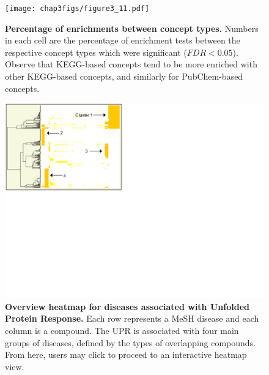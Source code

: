 \newpage

\begin{figure}[ht!]
\centering
\texttt{[image: chap3figs/figure3\_11.pdf]}
\caption[Proportion of enrichments between concept types.]
{
\textbf{Percentage of enrichments between concept types.} Numbers in each cell are the percentage of enrichment tests between the respective concept types which were significant ($FDR < 0.05$). Observe that KEGG-based concepts tend to be more enriched with other KEGG-based concepts, and similarly for PubChem-based concepts.
}
\label{chap3:fig:11}
\end{figure}

\newpage

\begin{figure}[ht!]
\centering
\includegraphics[width=1\textwidth]{chap3figs/figure3_12.pdf}
\caption[Overview heatmap for diseases associated with Unfolded Protein Response.]
{
\textbf{Overview heatmap for diseases associated with Unfolded Protein Response.} Each row represents a MeSH disease and each column is a compound. The UPR is associated with four main groups of diseases, defined by the types of overlapping compounds.  From here, users may click to proceed to an interactive heatmap view.
}
\label{chap3:fig:12}
\end{figure}

\newpage

